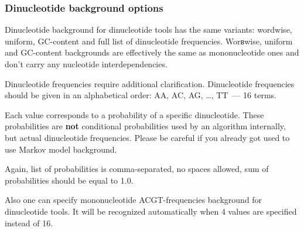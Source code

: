 \subsubsection{Dinucleotide background options}
Dinucleotide background for dinucleotide tools has the same variants: wordwise, uniform, GC-content and full list of dinucleotide frequencies. Worвwise, uniform and GC-content backgrounds are effectively the same as mononucleotide ones and don't carry any nucleotide interdependencies.

Dinucleotide frequencies require additional clarification. Dinucleotide frequencies should be given in an alphabetical order: AA, AC, AG, \dots, TT~--- 16 terms.

Each value corresponds to a probability of a specific dinucleotide. These probabilities are \textbf{not} conditional probabilities used by an algorithm internally, but actual dinucleotide frequencies.
Please be careful if you already got used to use Markov model background.

Again, list of probabilities is comma-separated, no spaces allowed, sum of probabilities should be equal to 1.0.

Also one can specify mononucleotide ACGT-frequencies background for dinucleotide tools. It will be recognized automatically when 4 values are specified instead of 16.
